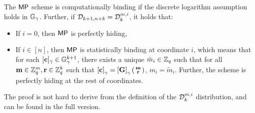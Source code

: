 \begin{theorem} \label{theo:mp} The $\mathsf{MP}$ scheme is computationally binding if  the discrete logarithm assumption holds in $\mathbb{G}_\gamma$. Further, if 
$\mathcal{D}_{k+1,n+k}=\mathcal{D}_k^{m,i}$, it holds that: 
\begin{itemize}
\item If $i=0$,  then $\mathsf{MP}$ is perfectly hiding,
\item If $i \in [n]$, then $\mathsf{MP}$ is statistically binding at coordinate $i$, which means that for each $[\mathbf{c}]_\gamma \in \mathbb{G}_{\gamma}^{k+1}$,
there exists a unique $\tilde{m}_i \in\mathbb{Z}_q$ such that for all $\mathbf{m} \in\mathbb{Z}_q^m, \mathbf{r} \in\mathbb{Z}_q^{k}$ such that  $\left[\mathbf{c}\right]_{\gamma}=\left[\mathbf{{G}}\right]_{\gamma}\left(\begin{smallmatrix}\mathbf{m}\\\mathbf{r}\end{smallmatrix}\right)$, $m_i=\tilde{m}_i$. Further, the scheme is perfectly hiding at the rest of coordinates. 
\end{itemize}
\end{theorem}
The proof is not hard to derive from the definition of the $\mathcal{D}_k^{m,i}$ distribution, and can be found in the full version. 


